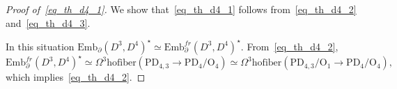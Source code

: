 \documentclass[11pt]{amsart}
\theoremstyle{definition}
\newcommand{\Emb}{\mathrm{Emb}}
\newcommand{\pdEmb}{\mathrm{pdEmb}}
\newcommand{\PL}{\mathrm{PL}}
\newcommand{\OO}{\mathrm{O}}
\newcommand{\PD}{\mathrm{PD}}
\newcommand{\mmod}{\,\mathrm{mod}\,}
\newcommand{\hofiber}{\mathrm{hofiber}}
\newcommand{\bbslash}{\backslash\!\!\backslash}
\newcommand\rth{\refstepcounter{equation}}
\newcommand\numb{\rth{\rm \theequation}}
\numberwithin{equation}{section}
\begin{document}
\begin{proof}[Proof of~\eqref{eq_th_d4_1}]
We show that~\eqref{eq_th_d4_1} follows from~\eqref{eq_th_d4_2} and~\eqref{eq_th_d4_3}.

\smallskip

 In this situation
$\Emb_\partial(D^3,D^4)^\star\simeq \Emb_\partial^{fr}(D^3,D^4)^\star.$ 
From~\eqref{eq_th_d4_2},
\[
 \Emb_\partial^{fr}(D^3,D^4)^\star\simeq \Omega^3\hofiber(\PD_{4,3}\to\PD_4/\OO_4)\simeq\Omega^3\hofiber(\PD_{4,3}/\OO_1\to\PD_4/\OO_4),
\]
which implies~\eqref{eq_th_d4_2}.



\end{proof}
\end{document}
